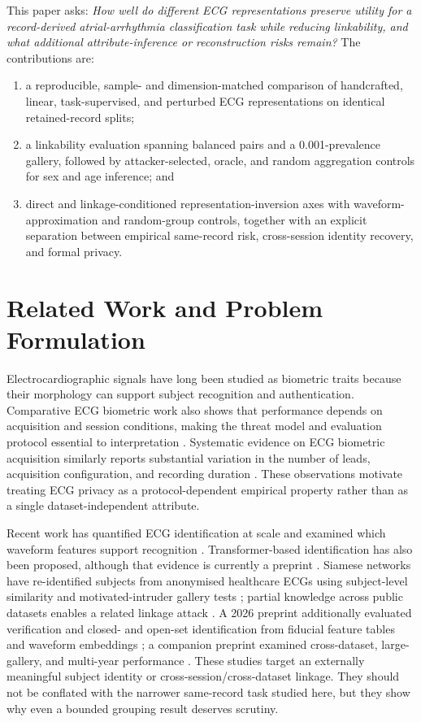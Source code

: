 \documentclass[journal]{IEEEtran}
\begin{document}
This paper asks: \emph{How well do different ECG representations preserve
utility for a record-derived atrial-arrhythmia classification task while
reducing linkability, and what additional attribute-inference or reconstruction
risks remain?} The contributions are:

\begin{enumerate}
\item a reproducible, sample- and dimension-matched comparison of handcrafted,
linear, task-supervised, and perturbed ECG representations on identical
retained-record splits;
\item a linkability evaluation spanning balanced pairs and a 0.001-prevalence
gallery, followed by attacker-selected, oracle, and random aggregation controls
for sex and age inference; and
\item direct and linkage-conditioned representation-inversion axes with
waveform-approximation and random-group controls, together with an explicit
separation between empirical same-record risk, cross-session identity recovery,
and formal privacy.
\end{enumerate}

\section{Related Work and Problem Formulation}
\label{sec:related-work}

Electrocardiographic signals have long been studied as biometric traits
because their morphology can support subject recognition and authentication.
Comparative ECG biometric work also shows that performance depends on
acquisition and session conditions, making the threat model and evaluation
protocol essential to interpretation \cite{Odinaka2012ECGBiometric}. Systematic
evidence on ECG biometric acquisition similarly reports substantial variation
in the number of leads, acquisition configuration, and recording duration
\cite{Pereira2023ECGBiometricReview}. These observations motivate treating ECG
privacy as a protocol-dependent empirical property rather than as a single
dataset-independent attribute.

Recent work has quantified ECG identification at scale and examined which
waveform features support recognition
\cite{Ghazarian2022ECGIdentification,Wang2024ECGUnveiled}. Transformer-based
identification has also been proposed, although that evidence is currently a
preprint \cite{Wang2025TransECG}. Siamese networks have re-identified subjects
from anonymised healthcare ECGs using subject-level similarity and
motivated-intruder gallery tests \cite{Macierzanka2025SiameseECG}; partial
knowledge across public datasets enables a related linkage attack
\cite{Wang2025ECGLinkage}. A 2026 preprint additionally evaluated verification
and closed- and open-set identification from fiducial feature tables and
waveform embeddings \cite{Scagnetto2026VerIde}; a companion preprint examined
cross-dataset, large-gallery, and multi-year performance
\cite{Scagnetto2026External}. These studies target an externally meaningful
subject identity or cross-session/cross-dataset linkage. They should not be
conflated with the narrower same-record task studied here, but they
show why even a bounded grouping result deserves scrutiny.
\end{document}
